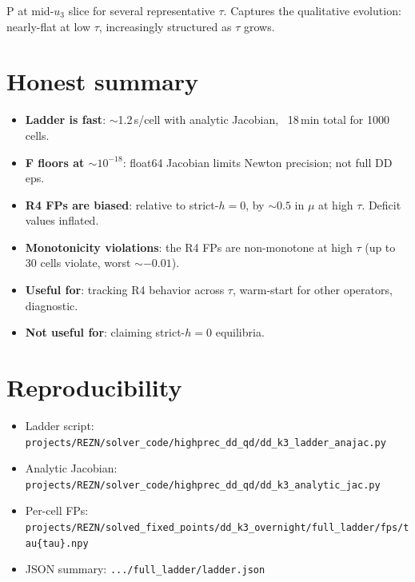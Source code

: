 \documentclass[11pt]{article}
\begin{document}
P at mid-$u_3$ slice for several representative $\tau$. Captures the
qualitative evolution: nearly-flat at low $\tau$, increasingly structured
as $\tau$ grows.

\section{Honest summary}

\begin{itemize}
  \item \textbf{Ladder is fast}: $\sim$1.2\,s/cell with analytic Jacobian,
        ~18\,min total for 1000 cells.
  \item \textbf{F floors at $\sim 10^{-18}$}: float64 Jacobian limits
        Newton precision; not full DD eps.
  \item \textbf{R4 FPs are biased}: relative to strict-$h{=}0$, by
        $\sim 0.5$ in $\mu$ at high $\tau$. Deficit values inflated.
  \item \textbf{Monotonicity violations}: the R4 FPs are non-monotone at
        high $\tau$ (up to 30 cells violate, worst $\sim -0.01$).
  \item \textbf{Useful for}: tracking R4 behavior across $\tau$, warm-start
        for other operators, diagnostic.
  \item \textbf{Not useful for}: claiming strict-$h{=}0$ equilibria.
\end{itemize}

\section{Reproducibility}

\begin{itemize}
  \item Ladder script:
        \texttt{projects/REZN/solver\_code/highprec\_dd\_qd/dd\_k3\_ladder\_anajac.py}
  \item Analytic Jacobian:
        \texttt{projects/REZN/solver\_code/highprec\_dd\_qd/dd\_k3\_analytic\_jac.py}
  \item Per-cell FPs:
        \texttt{projects/REZN/solved\_fixed\_points/dd\_k3\_overnight/full\_ladder/fps/tau\{tau\}.npy}
  \item JSON summary: \texttt{.../full\_ladder/ladder.json}
\end{itemize}
\end{document}
